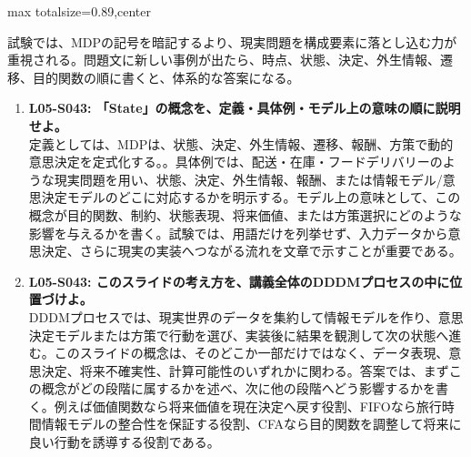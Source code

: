 \begin{minipage}[t]{0.58\textwidth}
\begin{adjustbox}{max totalsize={\textwidth}{0.89\textheight},center}
\begin{minipage}{\textwidth}
試験では、MDPの記号を暗記するより、現実問題を構成要素に落とし込む力が重視される。問題文に新しい事例が出たら、時点、状態、決定、外生情報、遷移、目的関数の順に書くと、体系的な答案になる。\par{}\begin{enumerate}\item \textbf{L05-S043: 「State」の概念を、定義・具体例・モデル上の意味の順に説明せよ。}\\定義としては、MDPは、状態、決定、外生情報、遷移、報酬、方策で動的意思決定を定式化する。。具体例では、配送・在庫・フードデリバリーのような現実問題を用い、状態、決定、外生情報、報酬、または情報モデル/意思決定モデルのどこに対応するかを明示する。モデル上の意味として、この概念が目的関数、制約、状態表現、将来価値、または方策選択にどのような影響を与えるかを書く。試験では、用語だけを列挙せず、入力データから意思決定、さらに現実の実装へつながる流れを文章で示すことが重要である。\item \textbf{L05-S043: このスライドの考え方を、講義全体のDDDMプロセスの中に位置づけよ。}\\DDDMプロセスでは、現実世界のデータを集約して情報モデルを作り、意思決定モデルまたは方策で行動を選び、実装後に結果を観測して次の状態へ進む。このスライドの概念は、そのどこか一部だけではなく、データ表現、意思決定、将来不確実性、計算可能性のいずれかに関わる。答案では、まずこの概念がどの段階に属するかを述べ、次に他の段階へどう影響するかを書く。例えば価値関数なら将来価値を現在決定へ戻す役割、FIFOなら旅行時間情報モデルの整合性を保証する役割、CFAなら目的関数を調整して将来に良い行動を誘導する役割である。\end{enumerate}
\end{minipage}
\end{adjustbox}
\end{minipage}


